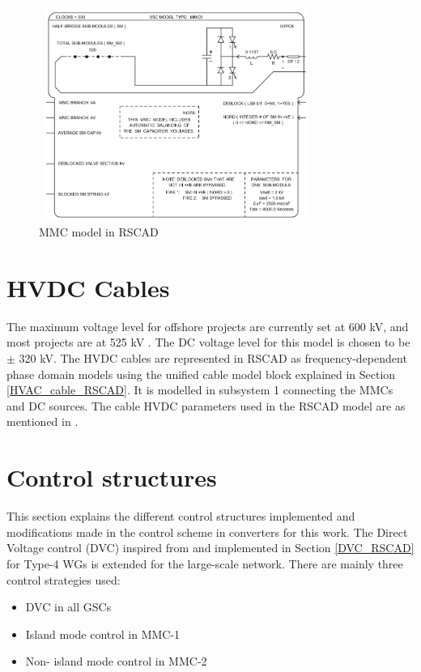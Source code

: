 \begin{figure}[H]
\centering
    \includegraphics[height = 7cm,width = 9cm]{Diagrams/Chapter_4/MMC5_RSCAD_2.PNG}
    \caption{MMC model in RSCAD}
    \label{fig:MMC5_RSCAD_2}
\end{figure}

\section{\gls{HVDC} Cables}
The maximum voltage level for offshore projects are currently set at 600 kV, and most projects are at 525 kV \cite{lagrotteria_hvdc_2019}. The \gls{DC} voltage level for this model is chosen to be $\pm$ 320 kV. The \gls{HVDC} cables are represented in RSCAD as frequency-dependent phase domain models using the unified cable model block explained in Section \ref{HVAC_cable_RSCAD}. It is modelled in subsystem 1 connecting the \gls{MMC}s and \gls{DC} sources. 
The cable \gls{HVDC} parameters used in the RSCAD model are as mentioned in \cite{wachal2014guide}.

\section{Control structures}
This section explains the different control structures implemented and modifications made in the control scheme in converters for this work. The Direct Voltage control (\gls{DVC}) inspired from \cite{erlich_new_2017} and implemented in Section \ref{DVC_RSCAD} for Type-4 \gls{WG}s is extended for the large-scale network. There are mainly three control strategies used:
\begin{itemize}
    \item \gls{DVC} in all \gls{GSC}s
    \item Island mode control in \gls{MMC}-1
    \item Non- island mode control in \gls{MMC}-2
\end{itemize}

